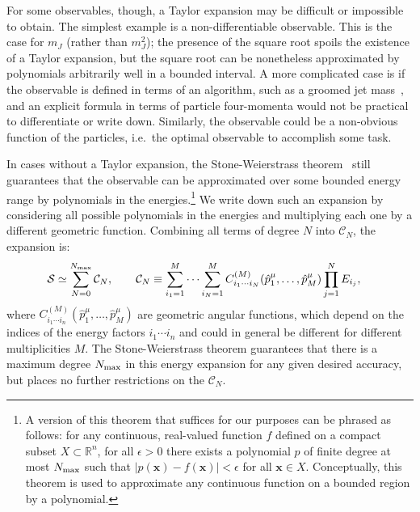 \documentclass[letterpaper,11pt]{article}
\begin{document}
For some observables, though, a Taylor expansion may be difficult or impossible to obtain. 
%
The simplest example is a non-differentiable observable.
%
This is the case for $m_J$ (rather than $m_J^2$); the presence of the square root spoils the existence of a Taylor expansion, but the square root can be nonetheless approximated by polynomials arbitrarily well in a bounded interval.
%
A more complicated case is if the observable is defined in terms of an algorithm, such as a groomed jet mass~\cite{Butterworth:2008iy,Ellis:2009su,Ellis:2009me,Krohn:2009th,Dasgupta:2013ihk,Larkoski:2014wba}, and an explicit formula in terms of particle four-momenta would not be practical to differentiate or write down.
%
Similarly, the observable could be a non-obvious function of the particles, i.e.\ the optimal observable to accomplish some task.  

In cases without a Taylor expansion, the Stone-Weierstrass theorem~\cite{stone1948generalized} still guarantees that the observable can be approximated over some bounded energy range by polynomials in the energies.\footnote{A version of this theorem that suffices for our purposes can be phrased as follows: for any continuous, real-valued function $f$ defined on a compact subset  $X\subset\mathbb R^n$, for all $\epsilon>0$ there exists a polynomial $p$ of finite degree at most $N_{\rm max}$ such that $|p(\mathbf x)-f(\mathbf x)|<\epsilon$ for all $\mathbf x\in X$. Conceptually, this theorem is used to approximate any continuous function on a bounded region by a polynomial.} 
%
We write down such an expansion by considering all possible polynomials in the energies and multiplying each one by a different geometric function.
%
Combining all terms of degree $N$ into $\mathcal C_N$, the expansion is:
\begin{align}\label{eq:SWexpand}
\mathcal S&\simeq\sum_{N=0}^{N_{\rm max}}\mathcal C_N,\qquad
\mathcal C_N\equiv\sum_{i_1=1}^M \cdots \sum_{i_N=1}^M C^{(M)}_{i_1 \cdots i_N}(\hat p_1^\mu,\ldots, \hat p_M^\mu)\prod_{j=1}^N E_{i_j},
\end{align}
where $C_{i_1\cdots i_n}^{(M)}(\hat p_1^\mu,\ldots,\hat p_M^\mu)$ are geometric angular functions, which depend on the indices of the energy factors $i_1\cdots i_n$ and could in general be different for different multiplicities $M$.
%
The Stone-Weierstrass theorem guarantees that there is a maximum degree $N_{\rm max}$ in this energy expansion for any given desired accuracy, but places no further restrictions on the $\mathcal C_N$.
\end{document}

